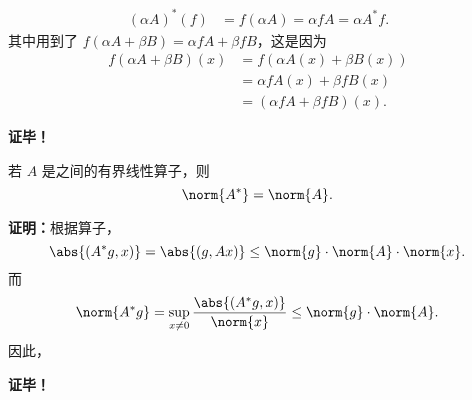 \begin{equation}
\begin{aligned}
(\alpha A)^*(f)&=f(\alpha A)=\alpha fA=\alpha A^*f.
\end{aligned}~
\end{equation}
其中用到了 $f(\alpha A+\beta B)=\alpha fA+\beta fB$，这是因为
\begin{equation}
\begin{aligned}
f(\alpha A+\beta B)(x)&=f(\alpha A(x)+\beta B(x))\\
&=\alpha fA(x)+\beta fB(x)\\
&=(\alpha fA+\beta fB)(x).
\end{aligned}~
\end{equation}

\textbf{证毕！}



\begin{theorem}{}
若 $A$ 是之间的有界线性算子，则
\begin{equation}
\norm{A^*}=\norm{A}.~
\end{equation}

\end{theorem}

\textbf{证明：}根据算子，
\begin{equation}
\abs{(A^*g,x)}=\abs{(g,Ax)}\leq\norm{g}\cdot\norm{A}\cdot\norm{x}.~
\end{equation}
而 
\begin{equation}
\norm{A^*g}=\sup_{x\neq0} \frac{\abs{(A^*g,x)}}{\norm{x}}\leq\norm{g}\cdot\norm{A}.~
\end{equation}
因此，

\textbf{证毕！}


